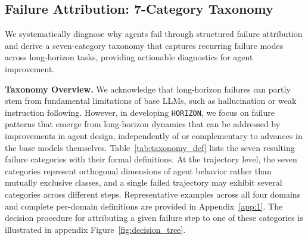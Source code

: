 \documentclass[11pt]{article}
\begin{document}
\subsection{Failure Attribution: 7-Category Taxonomy}
\label{subsec:failure_taxonomy}

We systematically diagnose why agents fail through structured failure attribution and derive a seven-category taxonomy that captures recurring failure modes across long-horizon tasks, providing actionable diagnostics for agent improvement.

\textbf{Taxonomy Overview.}
We acknowledge that long-horizon failures can partly stem from fundamental limitations of base LLMs, such as hallucination or weak instruction following. However, in developing \texttt{HORIZON}, we focus on failure patterns that emerge from long-horizon dynamics that can be addressed by improvements in agent design, independently of or complementary to advances in the base models themselves. Table~\ref{tab:taxonomy_def} lists the seven resulting failure categories with their formal definitions. At the trajectory level, the seven categories represent orthogonal dimensions of agent behavior rather than mutually exclusive classes, and a single failed trajectory may exhibit several categories across different steps. Representative examples across all four domains and complete per-domain definitions are provided in Appendix~\ref{app:1}. The decision procedure for attributing a given failure step to one of these categories is illustrated in appendix Figure~\ref{fig:decision_tree}.

\end{document}
